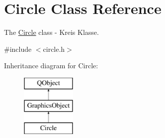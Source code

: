\hypertarget{class_circle}{}\section{Circle Class Reference}
\label{class_circle}


The \hyperlink{class_circle}{Circle} class -\/ Kreis Klasse.  




{\ttfamily \#include $<$circle.\+h$>$}

Inheritance diagram for Circle\+:\begin{figure}[H]
\begin{center}
\leavevmode
\includegraphics[height=3.000000cm]{class_circle}
\end{center}
\end{figure}
